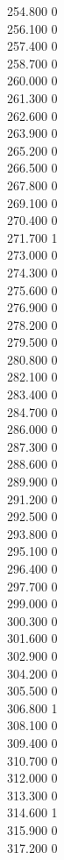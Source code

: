 { 254.800	0 \\
 256.100	0 \\
 257.400	0 \\
 258.700	0 \\
 260.000	0 \\
 261.300	0 \\
 262.600	0 \\
 263.900	0 \\
 265.200	0 \\
 266.500	0 \\
 267.800	0 \\
 269.100	0 \\
 270.400	0 \\
 271.700	1 \\
 273.000	0 \\
 274.300	0 \\
 275.600	0 \\
 276.900	0 \\
 278.200	0 \\
 279.500	0 \\
 280.800	0 \\
 282.100	0 \\
 283.400	0 \\
 284.700	0 \\
 286.000	0 \\
 287.300	0 \\
 288.600	0 \\
 289.900	0 \\
 291.200	0 \\
 292.500	0 \\
 293.800	0 \\
 295.100	0 \\
 296.400	0 \\
 297.700	0 \\
 299.000	0 \\
 300.300	0 \\
 301.600	0 \\
 302.900	0 \\
 304.200	0 \\
 305.500	0 \\
 306.800	1 \\
 308.100	0 \\
 309.400	0 \\
 310.700	0 \\
 312.000	0 \\
 313.300	0 \\
 314.600	1 \\
 315.900	0 \\
 317.200	0 \\
}
